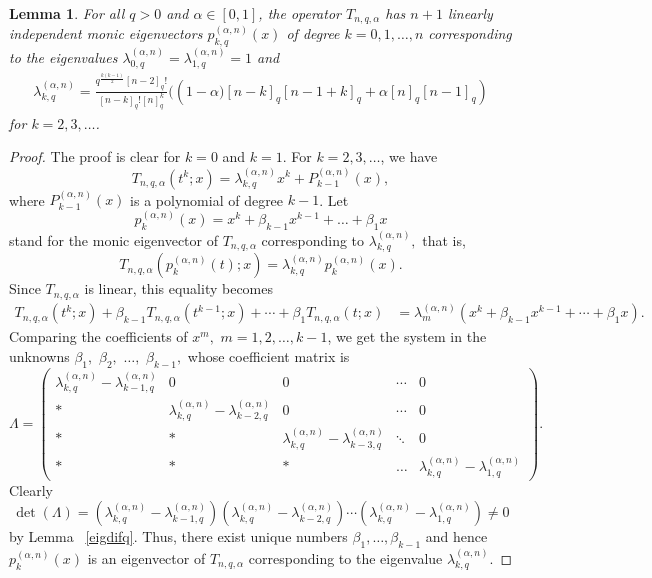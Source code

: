 \documentclass[12pt]{article}
\numberwithin{equation}{section} \theoremstyle{plain}
\newtheorem{lemma}[theorem]{Lemma}
\theoremstyle{definition}
\theoremstyle{remark}
\begin{document}
\begin{lemma}
For all $q>0$ and $\alpha \in [0,1] $, the operator $T_{n,q,\alpha}$ has $n+1$ linearly independent monic eigenvectors 
$p_{k,q}^{(\alpha,n)}(x)$ of degree $k=0,1,\ldots,n$ corresponding to the eigenvalues $\lambda_{0,q}^{(\alpha,n)}=\lambda_{1,q}^{(\alpha,n)}=1$ and 
\begin{align*}
\lambda_{k,q}^{(\alpha,n)}=\frac{q^{\frac{k(k-1)}{2}}[n-2]_q!}{[n-k]_q![n]_q^k}(\left(1-\alpha)[n-k]_q[n-1+k]_q+\alpha[n]_q[n-1]_q\right)
\end{align*}
for $k=2,3,\ldots$. 
\end{lemma}
\begin{proof}
The proof is clear for $k=0$ and $k=1$. For $k=2,3,\ldots$, we have 
$$
T_{n,q,\alpha}(t^k;x)=\lambda_{k,q}^{(\alpha,n)}x^k+P_{k-1}^{(\alpha,n)}(x),
$$
where $P_{k-1}^{(\alpha,n)}(x)$ is a polynomial of degree $k-1$. 
Let 
$$p_{k}^{(\alpha,n)}(x)=x^k+\beta_{k-1}x^{k-1}+\ldots+\beta_1x$$ 
stand for the monic eigenvector of $T_{n,q,\alpha}$ corresponding to $\lambda_{k,q}^{(\alpha,n)},$ that is, 
$$
T_{n,q,\alpha}(p_k^{(\alpha,n)}(t);x)=\lambda_{k,q}^{(\alpha,n)}p_{k}^{(\alpha,n)}(x).
$$
Since $T_{n,q,\alpha}$ is linear, this equality becomes
\begin{align*}
T_{n,q,\alpha}(t^k;x)+\beta_{k-1}T_{n,q,\alpha}(t^{k-1};x)+\cdots+\beta_1T_{n,q,\alpha}(t;x)&=\lambda_{m}^{(\alpha,n)}(x^k+\beta_{k-1}x^{k-1}+\cdots+\beta_{1}x).
\end{align*}
Comparing the coefficients of $x^m,$ $m=1,2,\ldots, k-1$, we get the system in the unknowns $\beta_1,$ $\beta_2,$ $\ldots,$ $\beta_{k-1},$ whose coefficient matrix is
$$
\Lambda=\begin{pmatrix}
\lambda_{k,q}^{(\alpha,n)}-\lambda_{k-1,q}^{(\alpha,n)}& 0 & 0 & \cdots & 0\\
 * & \lambda_{k,q}^{(\alpha,n)}-\lambda_{k-2,q}^{(\alpha,n)}& 0 & \cdots &0\\
*&*&\lambda_{k,q}^{(\alpha,n)}-\lambda_{k-3,q}^{(\alpha,n)} & \ddots&0\\
*&* & * &\dots&\lambda_{k,q}^{(\alpha,n)}-\lambda_{1,q}^{(\alpha,n)}
\end{pmatrix}.
$$
Clearly    
$$
\det(\Lambda)=(\lambda_{k,q}^{(\alpha,n)}-\lambda_{k-1,q}^{(\alpha,n)})(\lambda_{k,q}^{(\alpha,n)}-\lambda_{k-2,q}^{(\alpha,n)})\cdots(\lambda_{k,q}^{(\alpha,n)}-\lambda_{1,q}^{(\alpha,n)})\neq 0
$$
by Lemma ~\ref{eigdifq}. Thus, there exist unique numbers $\beta_1,\ldots,\beta_{k-1}$ and hence $p_{k}^{(\alpha,n)}(x)$ is an eigenvector of $T_{n,q,\alpha}$ corresponding to the eigenvalue $\lambda_{k,q}^{(\alpha,n)}$.
\end{proof}
\end{document}
